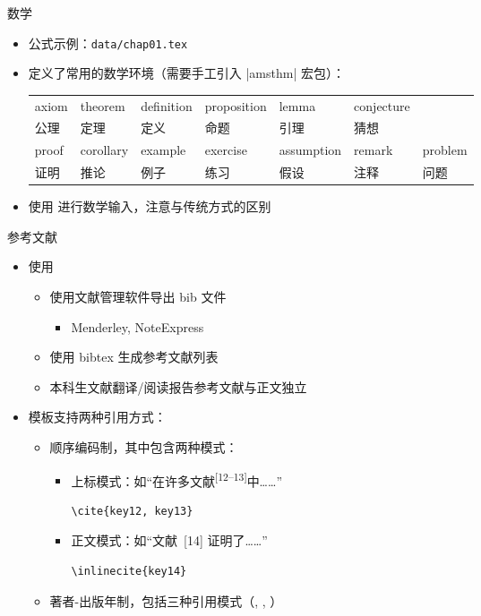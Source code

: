 \begin{frame}[fragile]{数学}
  \begin{itemize}
    \item 公式示例：\nolinkurl{data/chap01.tex}
    \item \ThuThesis{} 定义了常用的数学环境（需要手工引入 |amsthm| 宏包）：
      \begin{table}[h]
        \centering
        \footnotesize
\begin{tabular}{*{7}{l}}\toprule
  axiom & theorem & definition & proposition & lemma & conjecture &\\
  公理 & 定理 & 定义 & 命题 & 引理 & 猜想 &\\\midrule
  proof & corollary & example & exercise & assumption & remark & problem \\
  证明 & 推论 & 例子& 练习 & 假设 & 注释 & 问题\\\bottomrule
\end{tabular}
      \end{table}
      \item \ThuThesis{} 使用  进行数学输入，注意与传统方式的区别
  \end{itemize}
\end{frame}

\begin{frame}[fragile]{参考文献}
  \begin{itemize}
    \item 使用 \BibTeX
      \begin{itemize}
        \item 使用文献管理软件导出 bib 文件
          \begin{itemize}
            \item Menderley, NoteExpress
          \end{itemize}
        \item 使用 bibtex 生成参考文献列表
        \item 本科生文献翻译/阅读报告参考文献与正文独立
      \end{itemize}
    \item 模板支持两种引用方式：
      \begin{itemize}
        \item 顺序编码制，其中包含两种模式：
        \begin{itemize}
          \item 上标模式：如``在许多文献\textsuperscript{[12--13]}中……''
          \begin{lstlisting}[basicstyle=\ttfamily]
    \cite{key12, key13}
          \end{lstlisting}
        \item 正文模式：如``文献~[14] 证明了……''
          \begin{lstlisting}[basicstyle=\ttfamily]
    \inlinecite{key14}
          \end{lstlisting}
        \end{itemize}
        \item 著者-出版年制，包括三种引用模式（, , ）
      \end{itemize}
    \end{itemize}
\end{frame}

